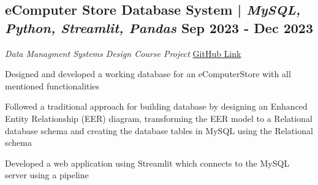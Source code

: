 

\subsection{{eComputer Store Database System | \textit{MySQL, Python, Streamlit, Pandas} \hfill Sep 2023 - Dec 2023}}
{\textit{Data Managment Systems Design Course Project} \hfill \href{https://github.com/vinay-ram1999/CS631-DMSD}{GitHub Link}}
\begin{zitemize}
\item {Designed and developed a working database for an eComputerStore with all mentioned functionalities}
\item {Followed a traditional approach for building database by designing an Enhanced Entity Relationship (EER) diagram, transforming the EER model to a Relational database schema and creating the database tables in MySQL using the Relational schema}
\item {Developed a web application using Streamlit which connects to the MySQL server using a pipeline}
\end{zitemize}




